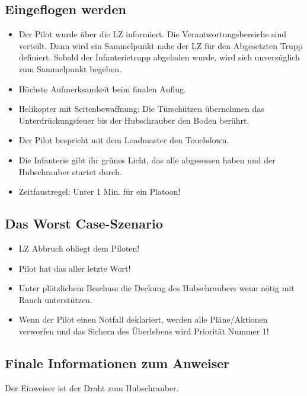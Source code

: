 \subsection{Eingeflogen werden}
	\begin{itemize} 
		\item Der Pilot wurde über die \ac{LZ} informiert. Die Verantwortungsbereiche sind verteilt. Dann wird ein Sammelpunkt nahe der \ac{LZ} für den Abgesetzten Trupp definiert. Sobald der Infanterietrupp abgeladen wurde, wird sich unverzüglich zum Sammelpunkt begeben.

		\item Höchste Aufmerksamkeit beim finalen Anflug.

		\item Helikopter mit Seitenbewaffnung: Die Türschützen übernehmen das Unter\-drückungs\-feuer bis der Hubschrauber den Boden berührt.

		\item Der Pilot bespricht mit dem Loadmaster den Touchdown.

		\item Die Infanterie gibt ihr grünes Licht, das alle abgesessen haben und der Hubschrauber startet durch.

		\item Zeitfaustregel: Unter 1 Min. für ein Platoon!
	\end{itemize}

\subsection{Das Worst Case-Szenario}
	\begin{itemize}
		\item \ac{LZ} Abbruch obliegt dem Piloten!
		\item Pilot hat das aller letzte Wort!
		\item Unter plötzlichem Beschuss die Deckung des Hubschraubers wenn nötig mit Rauch unterstützen.
		\item Wenn der Pilot einen Notfall deklariert, werden alle Pläne/Aktionen verworfen und das Sichern des Überlebens wird Priorität Nummer 1!
	\end{itemize}

\subsection{Finale Informationen zum Anweiser}
	Der Einweiser ist der Draht zum Hubschrauber.

